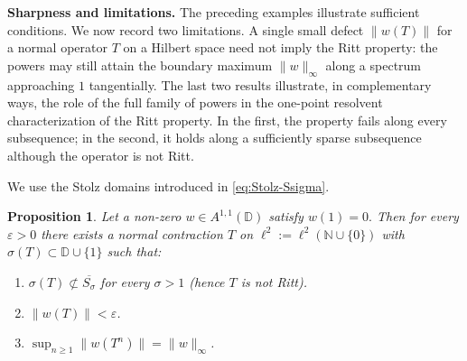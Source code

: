 \documentclass[11pt]{amsart}
\numberwithin{equation}{section}
\newtheorem{proposition}[theorem]{Proposition}
\theoremstyle{definition}
\theoremstyle{plain}
\def\T{\mathbb{T}}
\def\D{\mathbb{D}}
\begin{document}
\noindent\textbf{Sharpness and limitations.}
\label{subsec:examples_thm35}
The preceding examples illustrate sufficient conditions.  We now record two
limitations.  A single small defect \(\|w(T)\|\) for a normal operator $T$ on a Hilbert space need not imply the Ritt property:
the powers may still attain the boundary maximum \(\|w\|_\infty\) along a spectrum
approaching \(1\) tangentially.  
The last two results illustrate, in complementary ways, the role of the
full family of powers in the one-point resolvent characterization of the
Ritt property. In the first, the property fails along every subsequence;
in the second, it holds along a sufficiently sparse subsequence although
the operator is not Ritt.

We use the Stolz domains introduced in \eqref{eq:Stolz-Ssigma}.

\begin{proposition}
\label{prop:sharpness_abstract_w_exact}
Let a non-zero $w\in A^{1,1}(\D)$ satisfy $w(1)=0.$
Then for every $\varepsilon>0$ there exists a normal contraction $T$ on $\ell^2:=\ell^2(\mathbb N\cup \{0\})$ with
$\sigma(T)\subset \D\cup\{1\}$ such that:
\begin{enumerate}
\item[(i)] \(\sigma(T)\not\subset\overline{S_\sigma}\) for every
\(\sigma>1\) (hence \(T\) is not Ritt).
\item[(ii)] $\|w(T)\|<\varepsilon$.
\item[(iii)] $\displaystyle \sup_{n\ge1}\|w(T^n)\|=\|w\|_\infty$.
\end{enumerate}
\end{proposition}
\end{document}
